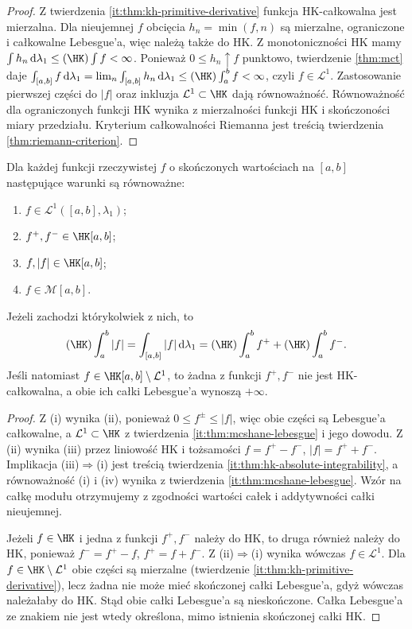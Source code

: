 \begin{proof}
Z twierdzenia \ref{it:thm:kh-primitive-derivative} funkcja HK-całkowalna jest mierzalna. Dla nieujemnej $f$ obcięcia $h_n=\min(f,n)$ są mierzalne, ograniczone i całkowalne Lebesgue'a, więc należą także do HK. Z monotoniczności HK mamy $\int h_n\,\mathrm d\lambda_1\le(\HK)\int f<\infty$. Ponieważ $0\le h_n\uparrow f$ punktowo, twierdzenie \ref{thm:mct} daje $\int_{[a,b]}f\,\mathrm d\lambda_1=\lim_n\int_{[a,b]}h_n\,\mathrm d\lambda_1\le(\HK)\int_a^b f<\infty$, czyli $f\in\mathcal L^1$. Zastosowanie pierwszej części do $|f|$ oraz inkluzja $\mathcal L^1\subset\HK$ dają równoważność. Równoważność dla ograniczonych funkcji HK wynika z mierzalności funkcji HK i skończoności miary przedziału. Kryterium całkowalności Riemanna jest treścią twierdzenia \ref{thm:riemann-criterion}.
\end{proof}

\begin{wniosek}
\label{it:cor:hk-positive-negative-integrability}
Dla każdej funkcji rzeczywistej $f$ o skończonych
wartościach na $[a,b]$ następujące warunki są równoważne:
\begin{enumerate}[label=(\roman*)]
\item $f\in\mathcal L^1([a,b],\lambda_1)$;
\item $f^+,f^-\in\HK[a,b]$;
\item $f,|f|\in\HK[a,b]$;
\item $f\in\mathcal M[a,b]$.
\end{enumerate}
Jeżeli zachodzi którykolwiek z nich, to
\[
 (\HK)\int_a^b|f|=
 \int_{[a,b]}|f|\,\mathrm d\lambda_1
 =(\HK)\int_a^b f^++(\HK)\int_a^b f^-.
\]
Jeśli natomiast $f\in\HK[a,b]\setminus\mathcal L^1$,
to żadna z funkcji $f^+,f^-$ nie jest HK-całkowalna,
a obie ich całki Lebesgue'a wynoszą $+\infty$.
\end{wniosek}
\begin{proof}
Z (i) wynika (ii), ponieważ $0\le f^\pm\le|f|$,
więc obie części są Lebesgue'a całkowalne, a
$\mathcal L^1\subset\HK$ z twierdzenia
\ref{it:thm:mcshane-lebesgue} i jego dowodu.
Z (ii) wynika (iii) przez liniowość HK i tożsamości
$f=f^+-f^-$, $|f|=f^++f^-$. Implikacja
(iii)$\Rightarrow$(i) jest treścią twierdzenia
\ref{it:thm:hk-absolute-integrability}, a równoważność
(i) i (iv) wynika z twierdzenia
\ref{it:thm:mcshane-lebesgue}. Wzór na całkę modułu
otrzymujemy z zgodności wartości całek i addytywności
całki nieujemnej.

Jeżeli $f\in\HK$ i jedna z funkcji $f^+,f^-$
należy do HK, to druga również należy do HK,
ponieważ $f^-=f^+-f$, $f^+=f+f^-$.
Z (ii)$\Rightarrow$(i) wynika wówczas $f\in\mathcal L^1$.
Dla $f\in\HK\setminus\mathcal L^1$ obie części są
mierzalne (twierdzenie \ref{it:thm:kh-primitive-derivative}),
lecz żadna nie może mieć skończonej całki Lebesgue'a,
gdyż wówczas należałaby do HK. Stąd obie całki
Lebesgue'a są nieskończone. Całka Lebesgue'a ze
znakiem nie jest wtedy określona, mimo istnienia
skończonej całki HK.
\end{proof}

